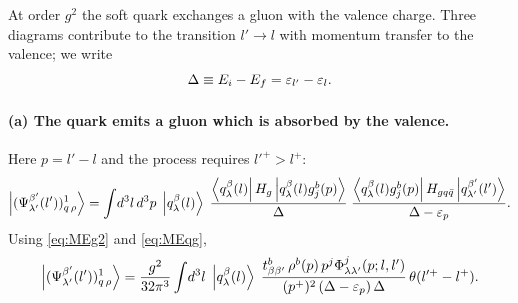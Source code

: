 At order $g^{2}$ the soft quark exchanges a gluon with the valence charge. Three diagrams
contribute to the transition $l'\to l$ with momentum transfer to the valence; we write
\begin{equation}
\Delta\equiv E_{i}-E_{f}=\varepsilon_{l'}-\varepsilon_{l}.
\end{equation}

\paragraph{(a) The quark emits a gluon which is absorbed by the valence.}
\begin{center}
\end{center}
Here $p=l'-l$ and the process requires $l'^{+}>l^{+}$:
\begin{equation}
\left|(\Psi^{\beta'}_{\lambda'}(l'))^{1}_{q\,\rho}\right\rangle=\int\!d^{3}l\,d^{3}p\;\left|q^{\beta}_{\lambda}(l)\right\rangle\;
\frac{\left\langle q^{\beta}_{\lambda}(l)\right|H_{g}\left|q^{\beta}_{\lambda}(l)g^{b}_{j}(p)\right\rangle}{\Delta}\;
\frac{\left\langle q^{\beta}_{\lambda}(l)g^{b}_{j}(p)\right|H_{gq\bar q}\left|q^{\beta'}_{\lambda'}(l')\right\rangle}{\Delta-\varepsilon_{p}} .
\end{equation}
Using \eqref{eq:MEg2} and \eqref{eq:MEqg},
\begin{equation}
\left|(\Psi^{\beta'}_{\lambda'}(l'))^{1}_{q\,\rho}\right\rangle=\frac{g^{2}}{32\pi^{3}}\int\!d^{3}l\;\left|q^{\beta}_{\lambda}(l)\right\rangle\;
\frac{t^{b}_{\beta\beta'}\,\rho^{b}(p)\,p^{j}\Phi^{j}_{\lambda\lambda'}(p;l,l')}{(p^{+})^{2}\,(\Delta-\varepsilon_{p})\,\Delta}\,
\theta(l'^{+}-l^{+}) .
\label{eq:P1a}
\end{equation}

